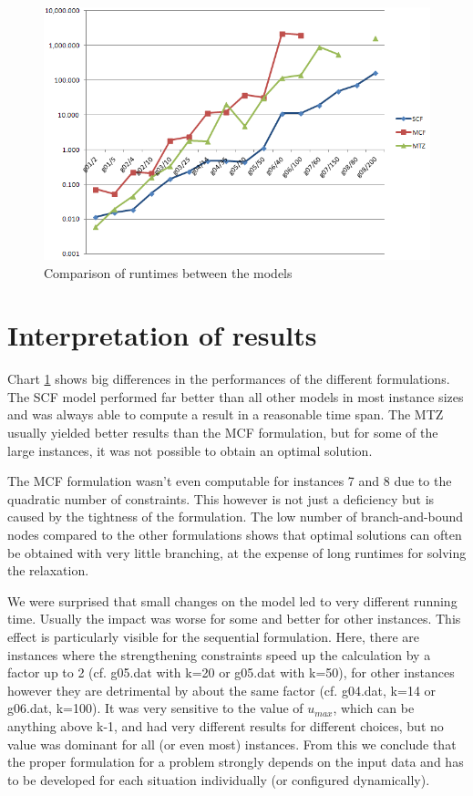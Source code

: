 \documentclass[,%
			paper=a4,%
			DIV14,
			liststotoc,
			bibtotoc,
			draft=false,%
			numbers=noendperiod
			]{scrartcl}
\begin{document}
\begin{figure}[htpb]
	\centering	\includegraphics[width=1.00\textwidth]{chart.png}
	\caption{Comparison of runtimes between the models}
	\label{fig:chart}
\end{figure}


\section{Interpretation of results}
Chart \ref{fig:chart} shows big differences in the performances of the different formulations. The SCF model performed far better than all other models in most instance sizes and was always able to compute a result in a reasonable time span. The MTZ usually yielded better results than the MCF formulation, but for some of the large instances, it was not possible to obtain an optimal solution.

The MCF formulation wasn't even computable for instances 7 and 8 due to the quadratic number of constraints.
This however is not just a deficiency but is caused by the tightness of the formulation.
The low number of branch-and-bound nodes compared to the other formulations shows that optimal solutions can often be obtained with very little branching, at the expense of long runtimes for solving the relaxation.

We were surprised that small changes on the model led to very different running time. Usually the impact was worse for some and better for other instances.
This effect is particularly visible for the sequential formulation. Here, there are instances where the strengthening constraints speed up the calculation by a factor up to 2 (cf. g05.dat with k=20 or g05.dat with k=50), for other instances however they are detrimental by about the same factor (cf. g04.dat, k=14 or g06.dat, k=100). It was very sensitive to the value of $u_{max}$, which can be anything above k-1, and had very different results for different choices, but no value was dominant for all (or even most) instances.
From this we conclude that the proper formulation for a problem strongly depends on the input data and has to be developed for each situation individually (or configured dynamically).
\end{document}
